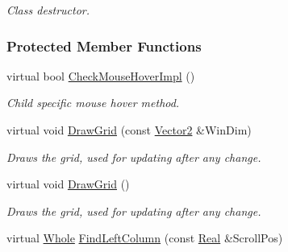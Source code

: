 \begin{DoxyCompactItemize}
\begin{DoxyCompactList}\small\item\em Class destructor. \item\end{DoxyCompactList}\end{DoxyCompactItemize}
\subsubsection*{Protected Member Functions}
\begin{DoxyCompactItemize}
\item 
\hypertarget{classMezzanine_1_1UI_1_1ScrolledCellGrid_a5822db2888835c19b1fd277910922e54}{
virtual bool \hyperlink{classMezzanine_1_1UI_1_1ScrolledCellGrid_a5822db2888835c19b1fd277910922e54}{CheckMouseHoverImpl} ()}
\label{classMezzanine_1_1UI_1_1ScrolledCellGrid_a5822db2888835c19b1fd277910922e54}

\begin{DoxyCompactList}\small\item\em Child specific mouse hover method. \item\end{DoxyCompactList}\item 
\hypertarget{classMezzanine_1_1UI_1_1ScrolledCellGrid_a3de975d563e2e9025311bf30520676d3}{
virtual void \hyperlink{classMezzanine_1_1UI_1_1ScrolledCellGrid_a3de975d563e2e9025311bf30520676d3}{DrawGrid} (const \hyperlink{classMezzanine_1_1Vector2}{Vector2} \&WinDim)}
\label{classMezzanine_1_1UI_1_1ScrolledCellGrid_a3de975d563e2e9025311bf30520676d3}

\begin{DoxyCompactList}\small\item\em Draws the grid, used for updating after any change. \item\end{DoxyCompactList}\item 
\hypertarget{classMezzanine_1_1UI_1_1ScrolledCellGrid_ad72ae715dc2ebe229c6960790ad3d8d6}{
virtual void \hyperlink{classMezzanine_1_1UI_1_1ScrolledCellGrid_ad72ae715dc2ebe229c6960790ad3d8d6}{DrawGrid} ()}
\label{classMezzanine_1_1UI_1_1ScrolledCellGrid_ad72ae715dc2ebe229c6960790ad3d8d6}

\begin{DoxyCompactList}\small\item\em Draws the grid, used for updating after any change. \item\end{DoxyCompactList}\item 
\hypertarget{classMezzanine_1_1UI_1_1ScrolledCellGrid_afd51cd4a447a56ba9b7bb6a2ee662e26}{
virtual \hyperlink{namespaceMezzanine_adcbb6ce6d1eb4379d109e51171e2e493}{Whole} \hyperlink{classMezzanine_1_1UI_1_1ScrolledCellGrid_afd51cd4a447a56ba9b7bb6a2ee662e26}{FindLeftColumn} (const \hyperlink{namespaceMezzanine_a726731b1a7df72bf3583e4a97282c6f6}{Real} \&ScrollPos)}
\label{classMezzanine_1_1UI_1_1ScrolledCellGrid_afd51cd4a447a56ba9b7bb6a2ee662e26}


\end{DoxyCompactItemize}
